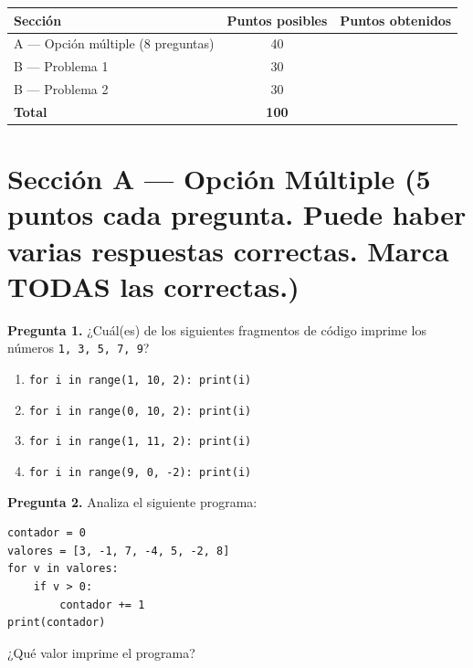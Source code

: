 \documentclass[12pt,a4paper]{article}
\begin{document}
\vspace{0.4cm}

\begin{center}
\begin{tabular}{lcc}
  \toprule
  \textbf{Sección} & \textbf{Puntos posibles} & \textbf{Puntos obtenidos} \\
  \midrule
  A — Opción múltiple (8 preguntas) & 40 & \\
  B — Problema 1 & 30 & \\
  B — Problema 2 & 30 & \\
  \midrule
  \textbf{Total} & \textbf{100} & \\
  \bottomrule
\end{tabular}
\end{center}

\newpage

\section*{\color{anahuacblue}Sección A — Opción Múltiple \normalsize(5 puntos cada pregunta. Puede haber varias respuestas correctas. Marca \textbf{TODAS} las correctas.)}

\medskip

\noindent\textbf{Pregunta 1.} ¿Cuál(es) de los siguientes fragmentos de código imprime los números \texttt{1, 3, 5, 7, 9}?

\begin{enumerate}[label=\alph*), leftmargin=2em, itemsep=4pt]
  \item[$\square$ a)] \lstinline|for i in range(1, 10, 2): print(i)|
  \item[$\square$ b)] \lstinline|for i in range(0, 10, 2): print(i)|
  \item[$\square$ c)] \lstinline|for i in range(1, 11, 2): print(i)|
  \item[$\square$ d)] \lstinline|for i in range(9, 0, -2): print(i)|
\end{enumerate}

\bigskip

\noindent\textbf{Pregunta 2.} Analiza el siguiente programa:
\begin{lstlisting}[style=PythonStyle]
contador = 0
valores = [3, -1, 7, -4, 5, -2, 8]
for v in valores:
    if v > 0:
        contador += 1
print(contador)
\end{lstlisting}
¿Qué valor imprime el programa?
\end{document}
